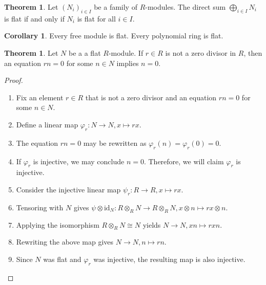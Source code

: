 \documentclass[a4paper]{book}
\theoremstyle{definition}
\newtheorem{theorem}[definition]{Theorem}
\newtheorem{corollary}{Corollary}
\begin{document}
\begin{thmbox}
    \begin{theorem}
        Let \((N_i)_{i \in I}\) be a family of \(R\)-modules. The direct sum \(\bigoplus_{i \in I} N_i\) is flat if and only if \(N_i\) is flat for all \(i \in I\).
    \end{theorem}
\end{thmbox}

\begin{thmbox}
    \begin{corollary}
        Every free module is flat. Every polynomial ring is flat.
    \end{corollary}
\end{thmbox}

\begin{thmbox}
    \begin{theorem}
        Let \(N\) be a a flat \(R\)-module. If \(r \in R\) is not a zero divisor in \(R\), then an equation \(rn = 0\) for some \(n \in N\) implies \(n = 0\).
    \end{theorem}
\end{thmbox}
\begin{proof}
    \begin{enumerate}
        \item Fix an element \(r \in R\) that is not a zero divisor and an equation \(rn = 0\) for some \(n \in N\).
        \item Define a linear map \(\varphi_r: N \longrightarrow N, x \mapsto rx\).
        \item The equation \(rn = 0\) may be rewritten as \(\varphi_r(n) = \varphi_r(0) = 0\).
        \item If \(\varphi_r\) is injective, we may conclude \(n = 0\). Therefore, we will claim \(\varphi_r\) is injective.
        \item Consider the injective linear map \(\psi_r: R \longrightarrow R, x \mapsto rx\).
        \item Tensoring with \(N\) gives \(\psi \otimes \text{id}_N: R \otimes_R N \longrightarrow R \otimes_R N, x \otimes n \mapsto rx \otimes n\).
        \item Applying the isomorphism \(R \otimes_R N \cong N\) yields \(N \longrightarrow N, xn \mapsto rxn\).
        \item Rewriting the above map gives \(N \longrightarrow N, n \mapsto rn\).
        \item Since \(N\) was flat and \(\varphi_r\) was injective, the resulting map is also injective.
    \end{enumerate}
\end{proof}
\end{document}
